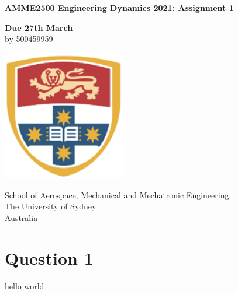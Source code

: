 \documentclass[11]{article}
\begin{document}
\begin{titlepage}
	\begin{center}
		\vspace*{1cm}

		\Huge
		\textbf{AMME2500 Engineering Dynamics 2021: Assignment 1}

		\vspace{0.5cm}
		\LARGE
		\textbf{Due 27th March} \\
		by 500459959

		\vspace{1.5cm}

		\large
		\vspace{1cm}

		\vfill

		\vspace{0.4cm}

		\includegraphics[width=0.4\textwidth]{photos/university-of-sydney.png}

		\Large
		School of Aerospace, Mechanical and Mechatronic Engineering\\
		The University of Sydney\\
		Australia\\

		\newpage
		\tableofcontents %
	\end{center}
\end{titlepage}

\newpage
\large
{}
\section{Question 1}
hello world 
\cite{newton}

\newpage


\end{document}

